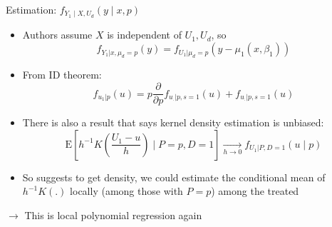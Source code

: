 \documentclass{beamer}
\begin{document}
\begin{frame}{Estimation: $f_{Y_1\mid X,U_d}(y\mid x,p)$}
  \begin{itemize}
\item Authors assume $X$ is independent of $U_1,U_d$, so
\begin{equation*}
  f_{Y_1|x,\mu_d=p}(y) = f_{U_1|\mu_d=p}(y-\mu_1(x,\beta_1))
\end{equation*}

\item From ID theorem:
  \begin{equation*}
    f_{u_1|p}(u) = p \frac{\partial}{\partial
    p}f_{u_.|p,s=1}(u) + f_{u_.|p,s=1}(u)
  \end{equation*}
\item There is also a result that says kernel density estimation is
  unbiased:
  \begin{equation*}
    \mathrm{E}\left[h^{-1}K\left(\frac{U_1-u}{h}\right)\mid P=p,
      D=1\right]\xrightarrow[h \rightarrow 0]{} f_{U_1|P,D=1}(u\mid p)
  \end{equation*}
\item So suggests to get density, we could estimate the conditional mean of
  $h^{-1}K(.)$ locally (among those with $P=p$) among the treated
  \end{itemize}
 $\rightarrow$ This is local polynomial regression again


\end{frame}
\end{document}
